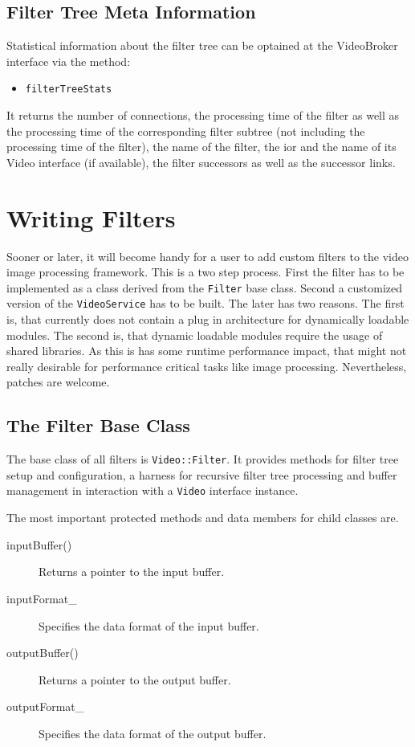 \subsection{Filter Tree Meta Information}

Statistical information about the filter tree can be optained at the
VideoBroker interface via the method:

\begin{itemize}
\item {\tt filterTreeStats}
\end{itemize}

It returns the number of connections, the processing time of the
filter as well as the processing time of the corresponding filter
subtree (not including the processing time of the filter), the name of
the filter, the ior and the name of its Video interface (if
available), the filter successors as well as the successor links.

\section{Writing Filters}

Sooner or later, it will become handy for a user to add 
custom filters to the video image processing framework. This is a two
step process. First the filter has to be implemented as a class
derived from the {\tt Filter} base class. Second a customized version
of the {\tt VideoService} has to be built. The later has two
reasons. The first is, that \miro currently does not contain a plug in
architecture for dynamically loadable modules. The second is, that
dynamic loadable modules require the usage of shared libraries. As
this is has some runtime performance impact, that might not really
desirable for performance critical tasks like image
processing. Nevertheless, patches are welcome.

\subsection{The Filter Base Class}

The base class of all filters is {\tt Video::Filter}. It provides
methods for filter tree setup and configuration, a harness for
recursive filter tree processing and buffer management in interaction
with a {\tt Video} interface instance.

The most important protected methods and data members for child classes are.
\begin{description}
\item[inputBuffer()] Returns a pointer to the input buffer.
\item[inputFormat\_] Specifies the data format of the input buffer.
\item[outputBuffer()] Returns a pointer to the output buffer.
\item[outputFormat\_] Specifies the data format of the output buffer.
\end{description}

